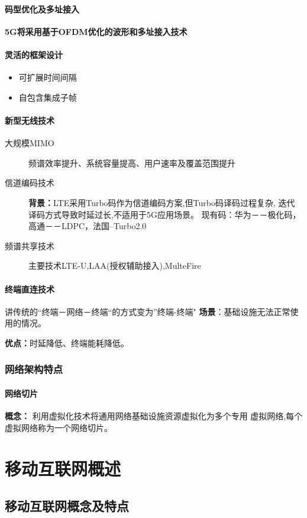 \documentclass{report}
\begin{document}
	\subsubsection{码型优化及多址接入}
	\textbf{ 5G将采用基于OFDM优化的波形和多址接入技术
	}
	\subsubsection{灵活的框架设计
	}
	\begin{itemize}
		\item  可扩展时间间隔
		\item  自包含集成子帧
		
	\end{itemize}
	\subsubsection{新型无线技术
	}
	\begin{description}
		\item[大规模MIMO
		]  频谱效率提升、系统容量提高、用户速率及覆盖范围提升
		\item[信道编码技术
		] \textbf{背景：}LTE采用Turbo码作为信道编码方案,但Turbo码译码过程复杂,
		迭代译码方式导致时延过长,不适用于5G应用场景。
		现有码：华为－－极化码，高通－－LDPC，法国--Turbo2.0
		\item[频谱共享技术] 主要技术LTE-U,LAA(授权辅助接入),MulteFire
	\end{description}
	\subsubsection{终端直连技术}
	讲传统的“终端－网络－终端“的方式变为”终端-终端"
	\textbf{场景}：基础设施无法正常使用的情况。
	
	\textbf{优点：}时延降低、终端能耗降低。
	\subsection{网络架构特点}
	\subsubsection{网络切片}
	\textbf{概念：} 利用虚拟化技术将通用网络基础设施资源虚拟化为多个专用
	虚拟网络,每个虚拟网络称为一个网络切片。
	
	\chapter{移动互联网概述}
	\section{移动互联网概念及特点}
\end{document}
